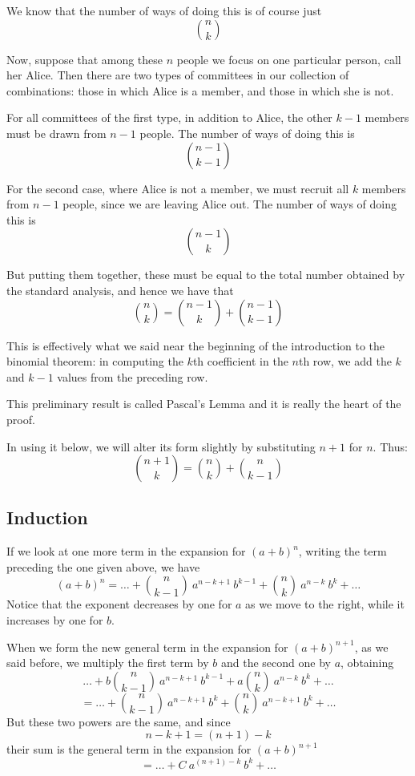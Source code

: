 \documentclass[11pt, oneside]{article}   	%
\begin{document}
We know that the number of ways of doing this is of course just
\[  {{n}\choose{k}} \]

Now, suppose that among these $n$ people we focus on one particular person, call her Alice.  Then there are two types of committees in our collection of combinations:  those in which Alice is a member, and those in which she is not.

For all committees of the first type, in addition to Alice, the other $k-1$ members must be drawn from $n-1$ people. The number of ways of doing this is
\[  {{n-1}\choose{k-1}} \]

For the second case, where Alice is not a member, we must recruit all $k$ members from $n-1$ people, since we are leaving Alice out.  The number of ways of doing this is
\[  {{n-1}\choose{k}} \]

But putting them together, these must be equal to the total number obtained by the standard analysis, and hence we have that
\[  {{n}\choose{k}} = {{n-1}\choose{k}} + {{n-1}\choose{k-1}} \]

This is effectively what we said near the beginning of the introduction to the binomial theorem:  in computing the $k$th coefficient in the $n$th row, we add the $k$ and $k-1$ values from the preceding row.

This preliminary result is called Pascal's Lemma and it is really the heart of the proof.

In using it below, we will alter its form slightly by substituting $n+1$ for $n$.  Thus:
\[  {{n+1}\choose{k}} = {{n}\choose{k}} + {{n}\choose{k-1}} \]

\subsection*{Induction}

If we look at one more term in the expansion for $(a+b)^n$, writing the term preceding the one given above, we have
\[ (a+b)^n = \dots + {{n}\choose{k-1}} \ a^{n-k+1} \ b^{k-1} + {{n}\choose{k}} \ a^{n-k} \ b^k + \dots  \]
Notice that the exponent decreases by one for $a$ as we move to the right, while it increases by one for $b$.

When we form the new general term in the expansion for $(a+b)^{n+1}$, as we said before, we multiply the first term by $b$ and the second one by $a$, obtaining
\[ \dots + b {{n}\choose{k-1}} \ a^{n-k+1} \ b^{k-1} + a {{n}\choose{k}} \ a^{n-k} \ b^k + \dots  \]
\[ = \dots +  {{n}\choose{k-1}} \ a^{n-k+1} \ b^{k} + {{n}\choose{k}} \ a^{n-k + 1} \ b^k + \dots  \]
But these two powers are the same, and since
\[ n-k+1 = (n + 1) - k \]
their sum is the general term in the expansion for $(a+b)^{n+1}$
\[ = \dots + C \ a^{(n+1)-k} \ b^k + \dots  \]
\end{document}
